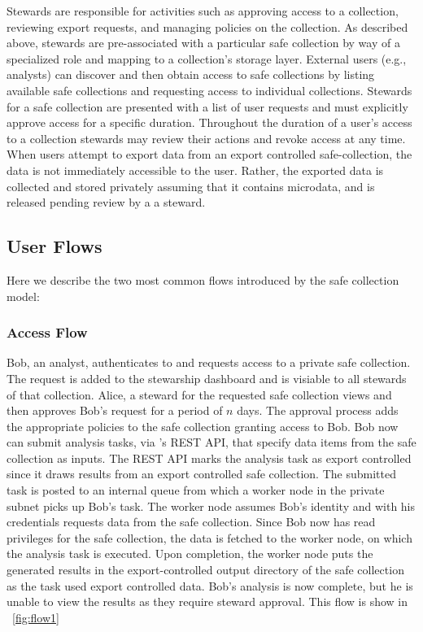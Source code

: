 Stewards are responsible for activities such as approving access to a collection, reviewing
export requests, and managing policies on the collection.
As described above, stewards are pre-associated with a particular safe collection by
way of a specialized role and mapping to a collection's storage layer.
External users (e.g., analysts) can discover
and then obtain access to safe collections by listing available safe collections and requesting
access to individual collections.
Stewards for a safe collection are presented with a list of user requests and must explicitly approve access
for a specific duration. Throughout the duration of a user's access to a collection
stewards may review their actions and revoke access at any time. When users attempt
to export data from an export controlled safe-collection, the data is not immediately
accessible to the user. Rather, the exported data is collected and stored privately
assuming that it contains microdata, and is released pending review by a a steward.


\subsection{User Flows}

Here we describe the two most common flows introduced by the safe collection model:

\subsubsection{Access Flow}

Bob, an analyst, authenticates to \NAME and requests access to a private safe collection.
The request is added to the stewarship dashboard and is visiable to all stewards
of that collection. Alice, a steward for the requested
safe collection views and then approves Bob's request for a period of $n$ days.
The approval process adds the appropriate policies to the
safe collection granting access to Bob. Bob now can submit analysis tasks, via
\NAMENS's REST API, that specify data items from the safe collection as inputs.
The REST API marks the analysis task as export controlled since it draws results
from an export controlled safe collection.
The submitted task is posted to an internal queue from which a
worker node in the \NAME private subnet picks up Bob's task. The worker node assumes Bob's identity and with
his credentials requests data from the safe collection. Since Bob now has read privileges for the
safe collection, the data is fetched to the worker node, on which the analysis task is executed.
Upon completion, the worker node puts the generated results in the export-controlled
output directory of the safe collection as the task used export controlled data.
Bob's analysis is now complete, but he is unable to view the
results as they require steward approval. This flow is show in \figurename~\ref{fig:flow1}

